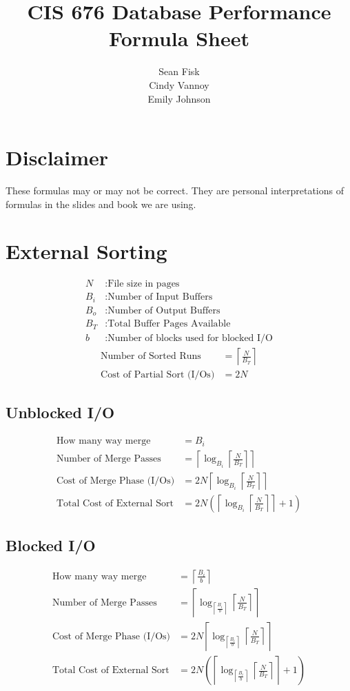 \documentclass{article}
\title{CIS 676 Database Performance Formula Sheet}
\author{Sean Fisk \mailtohref{sean@seanfisk.com} \\
  Cindy Vannoy \\
  Emily Johnson}
\newcommand{\ceil}[1]{\left\lceil#1\right\rceil}
\newcommand{\paren}[1]{\left(#1\right)}
\begin{document}
\maketitle

\section*{Disclaimer}

These formulas may or may not be correct. They are personal
interpretations of formulas in the slides and book we are using.

\section{External Sorting}

\begin{align*}
  N &: \text{File size in pages} \\
  B_i &: \text{Number of Input Buffers} \\
  B_o &: \text{Number of Output Buffers} \\
  B_T &: \text{Total Buffer Pages Available} \\
  b &: \text{Number of blocks used for blocked I/O}
\end{align*}
\begin{align}
  \text{Number of Sorted Runs} &= \ceil{\frac{N}{B_T}}\\
  \text{Cost of Partial Sort (I/Os)} &= 2N
\end{align}

\subsection{Unblocked I/O}
\begin{align}
  \text{How many way merge} &= B_i \\
  \text{Number of Merge Passes} &= \ceil{\log_{B_i}\ceil{\frac{N}{B_T}}} \\
  \text{Cost of Merge Phase (I/Os)} &= 2N\ceil{\log_{B_i}\ceil{\frac{N}{B_T}}} \\
  \text{Total Cost of External Sort} &= 2N\paren{\ceil{\log_{B_i}\ceil{\frac{N}{B_T}}} + 1}
\end{align}

\subsection{Blocked I/O}
\begin{align}
  \text{How many way merge} &= \ceil{\frac{B_i}{b}} \\
  \text{Number of Merge Passes} &= \ceil{\log_{\ceil{\frac{B_i}{b}}}\ceil{\frac{N}{B_T}}} \\
  \text{Cost of Merge Phase (I/Os)} &= 2N\ceil{\log_{\ceil{\frac{B_i}{b}}}\ceil{\frac{N}{B_T}}} \\
  \text{Total Cost of External Sort} &= 2N\paren{\ceil{\log_{\ceil{\frac{B_i}{b}}}\ceil{\frac{N}{B_T}}} + 1}
\end{align}
\end{document}
